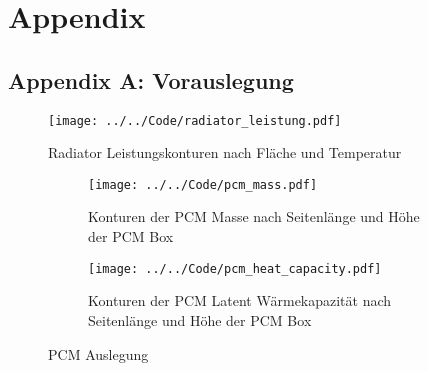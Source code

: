 \chapter*{Appendix}
\label{chapter:Appendix}
\pagestyle{Appendix}

\section*{Appendix A: Vorauslegung}\label{Anh:programmcode}

\begin{figure}[H]
  \centering
  \texttt{[image: ../../Code/radiator\_leistung.pdf]}
  \caption{Radiator Leistungskonturen nach Fläche und Temperatur}\label{fig:radiator_flaeche_leistung}
\end{figure}

\begin{figure}[H]
    \centering
    \begin{subfigure}{0.9\textwidth}
        \centering
        \texttt{[image: ../../Code/pcm\_mass.pdf]}
        \caption{Konturen der PCM Masse nach Seitenlänge und Höhe der PCM Box}\label{fig:pcm_mass}
    \end{subfigure}
    \vspace{1em}
    \begin{subfigure}{0.9\textwidth}
        \centering
        \texttt{[image: ../../Code/pcm\_heat\_capacity.pdf]}
        \caption{Konturen der PCM Latent Wärmekapazität nach Seitenlänge und Höhe der PCM Box}\label{fig:pcm_heat}
    \end{subfigure}
    \caption{PCM Auslegung}\label{fig:pcm_mass_heat}
\end{figure}

\newpage

